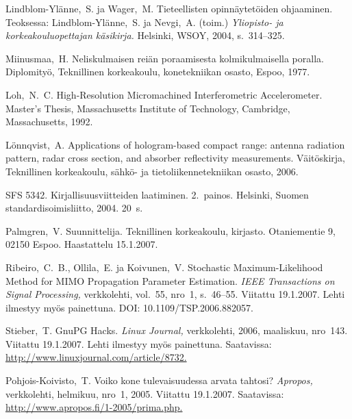 \documentclass[finnish, 12pt, a4paper, sci, utf8, pdfa]{aaltothesis}
\begin{document}
\begin{thebibliography}{99}
 Lindblom-Ylänne,\ S. ja Wager,\ M.  Tieteellisten
  opinnäytetöiden ohjaaminen. Teoksessa: Lindblom-Ylänne,\ S. ja
  Nevgi,\ A. (toim.) \textit{Yliopisto- ja korkeakouluopettajan
    käsikirja.}  Helsinki, WSOY, 2004, s.\ 314--325.
 
 Miinusmaa,\ H. Neliskulmaisen reiän poraamisesta
  kolmikulmaisella poralla. Diplomityö, Teknillinen korkeakoulu,
  konetekniikan osasto, Espoo, 1977.

 Loh,\ N.\ C. High-Resolution Micromachined
  Interferometric Accelerometer. Master's Thesis, Massachusetts
  Institute of Technology, Cambridge,
  \foreignlanguage{english}{Massachusetts,} 1992.

 Lönnqvist,\ A.
  \foreignlanguage{english}{Applications of hologram-based compact
    range: antenna radiation pattern, radar cross section, and
    absorber reflectivity measurements.}
  Väitöskirja, Teknillinen korkeakoulu, sähkö- ja tietoliikennetekniikan
  osasto, 2006.

 SFS 5342. Kirjallisuusviitteiden laatiminen. 2.\ painos.
  Helsinki, Suomen standardisoimisliitto, 2004. 20~s.

 Palmgren,\ V. Suunnittelija. Teknillinen
  korkeakoulu, kirjasto. Otaniementie 9, 02150 Espoo. Haastattelu
  15.1.2007.

 Ribeiro,\ C.\ B., Ollila,\ E. ja Koivunen,\ V.
  \foreignlanguage{english}{Stochastic Maximum-Likelihood Method for
    MIMO Propagation Parameter Estimation.}
 \textit{IEEE Transactions
    on Signal Processing,} verkkolehti, vol.\ 55, nro~1, s.\ 46--55.
  Viitattu 19.1.2007. Lehti ilmestyy myös painettuna. DOI:
  10.1109/TSP.2006.882057.

 Stieber,\ T. GnuPG Hacks. \textit{Linux Journal,}
  verkkolehti, 2006, maaliskuu, nro~143. Viitattu 19.1.2007. Lehti
  ilmestyy myös painettuna. Saatavissa:
  \url{http://www.linuxjournal.com/article/8732.}

 Pohjois-Koivisto,\ T. Voiko kone tulevaisuudessa arvata
  tahtosi?  \textit{Apropos,} verkkolehti, helmikuu, nro~1, 2005.
  Viitattu 19.1.2007.  Saatavissa:
  \url{http://www.apropos.fi/1-2005/prima.php.}


\end{thebibliography}
\end{document}
